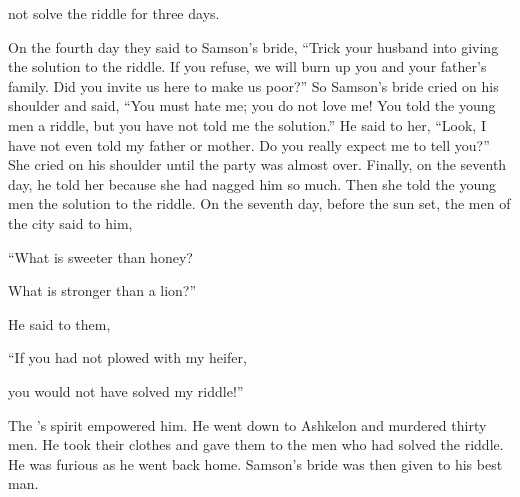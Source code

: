 {not
solve
the riddle
for three
days.
\par }{\PP {}On
the fourth
day
they said
to Samson’s
bride, “Trick
your husband
into giving the solution to the riddle.
If you refuse, we
will burn up
you and your father’s
family.
Did you invite
us here to make us poor?”
So Samson’s
bride cried
on
his shoulder
and said,
“You must
hate
me; you do not
love
me! You told the young men
a riddle,
but you have not
told me the solution.”
He said
to her, “Look,
I have not
even told my father
or mother. Do you really expect me to tell you?”
She cried
on
his shoulder until the party
was
almost
over. Finally, on
the seventh
day, he told
her because
she had nagged
him so much. Then she told
the young
men
the solution to the riddle.
On the seventh
day,
before
the sun
set,
the men
of the city
said
to him,
\par }{\Q “What
is sweeter
than honey?
\par }{\Q What
is stronger
than a lion?”
\par }{\PI He said
to them,
\par }{\Q “If
you had not plowed
with my heifer,
\par }{\Q you would not
have
solved my riddle!”
\par }{\PP {}The
{}’s
spirit
empowered
him. He went down
to Ashkelon
and murdered
thirty
men.
He took
their clothes
and gave
them to the men who had solved
the riddle.
He was furious
as he went back
home.
Samson’s
bride was then given to his best man.

}
